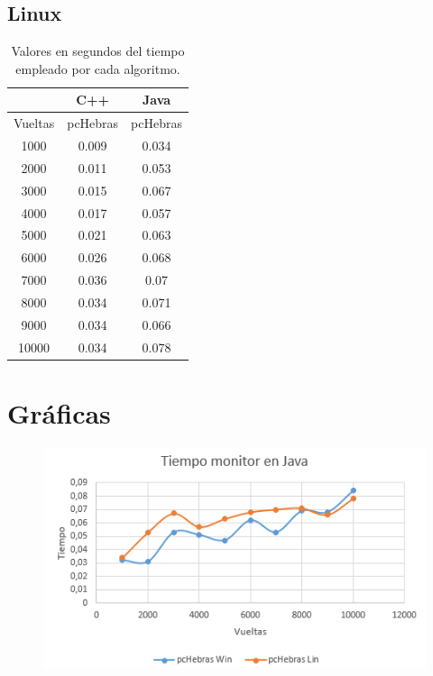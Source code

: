\documentclass[12pt,letterpaper]{article}
\begin{document}
\subsection{Linux}
\begin{center}
	\begin{table}[htbp]
		\begin{center}
			\begin{tabular}{|c|c|c|}
				\hline
				& \multicolumn{1}{c|}{C++} & \multicolumn{1}{c|}{Java}  \\
				\hline
				Vueltas  & pcHebras & pcHebras \\\hline
				1000 & 0.009 & 0.034  \\\hline
				2000 & 0.011 & 0.053  \\\hline
				3000 & 0.015 & 0.067  \\\hline
				4000 & 0.017 & 0.057  \\\hline
				5000 & 0.021 & 0.063  \\\hline
				6000 & 0.026 & 0.068  \\\hline
				7000 & 0.036 & 0.07  \\\hline
				8000 & 0.034 & 0.071  \\\hline
				9000 & 0.034 & 0.066  \\\hline
				10000 & 0.034 & 0.078  \\\hline
			\end{tabular}
			\caption{Valores en segundos del tiempo empleado por cada algoritmo.}
			\label{tabla:Valores en segundos del tiempo empleado cada algoritmo}
		\end{center}
	\end{table}
\end{center}
\section{Gráficas}
\newpage

\begin{center}
	\begin{figure}
		\includegraphics[scale=1.3]{TiempoMonitorJava.png}
	\end{figure}
\end{center}
\end{document}
